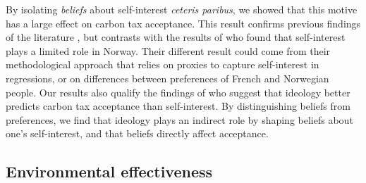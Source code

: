 \documentclass[12pt]{article} %
\begin{document}


By isolating \textit{beliefs} about self-interest \textit{ceteris paribus}, we showed that this motive has a large effect on carbon tax acceptance. This result confirms previous findings of the literature  \citep{stern_value_1993,thalmann_public_2004,baranzini_effectiveness_2017}, but contrasts with the results of \citet{kallbekken_saelen_2011} who found that self-interest plays a limited role in Norway. Their different result could come from their methodological approach that relies on proxies to capture self-interest in regressions, or on differences between preferences of French and Norwegian people. Our results also qualify the findings of \citet{anderson_can_2019} who suggest that ideology better predicts carbon tax acceptance than self-interest. By distinguishing beliefs from preferences, we find that ideology plays an indirect role by shaping beliefs about one's self-interest, and that beliefs directly affect acceptance.


    \subsection{Environmental effectiveness}\label{subsec:motive_ee}
\end{document}

